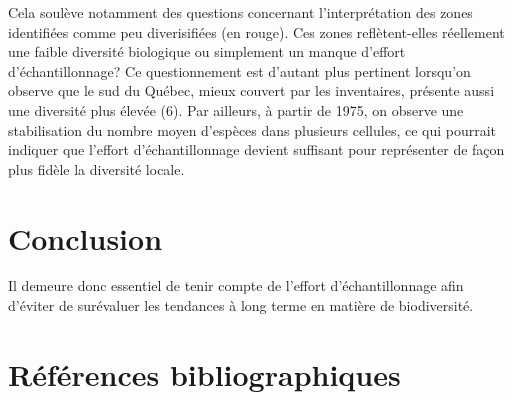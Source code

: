 \documentclass[9pt,twocolumn,twoside,]{pnas-new}
\begin{document}
Cela soulève notamment des questions concernant l'interprétation des
zones identifiées comme peu diverisifiées (en rouge). Ces zones
reflètent-elles réellement une faible diversité biologique ou simplement
un manque d'effort d'échantillonnage? Ce questionnement est d'autant
plus pertinent lorsqu'on observe que le sud du Québec, mieux couvert par
les inventaires, présente aussi une diversité plus élevée (6). Par
ailleurs, à partir de 1975, on observe une stabilisation du nombre moyen
d'espèces dans plusieurs cellules, ce qui pourrait indiquer que l'effort
d'échantillonnage devient suffisant pour représenter de façon plus
fidèle la diversité locale.

\section{Conclusion}\label{conclusion}

Il demeure donc essentiel de tenir compte de l'effort d'échantillonnage
afin d'éviter de surévaluer les tendances à long terme en matière de
biodiversité.

\section{Références
bibliographiques}\label{ruxe9fuxe9rences-bibliographiques}

\showmatmethods
\pnasbreak
\end{document}
